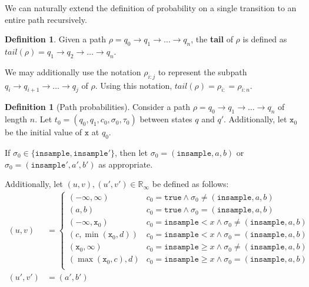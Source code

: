 \documentclass[12pt]{article}
\newcommand{\RR}{\mathbb{R}}
\newcommand{\gguard}[1][x]{\texttt{insample}\geq #1}
\newcommand{\lguard}[1][x]{\texttt{insample} < #1}
\theoremstyle{definition}
\newtheorem{defn}[thm]{Definition}
\begin{document}
We can naturally  extend the definition of probability on a single transition to an entire path recursively.

\begin{defn}
    Given a path $\rho = q_0\to q_1\to \ldots \to q_n$, the \textbf{tail} of $\rho$ is defined as $tail(\rho) = q_1\to q_2 \to \ldots\to q_n$. 

    We may additionally use the notation $\rho_{i:j}$ to represent the subpath $q_i\to q_{i+1}\to \ldots \to q_j$ of $\rho$. Using this notation, $tail(\rho) = \rho_{i:} = \rho_{i:n}$.
\end{defn}

\begin{defn}[Path probabilities]
    Consider a path $\rho = q_0\to q_1\to \ldots \to q_n$ of length $n$. Let $t_0=(q_0, q_1, c_0, \sigma_0, \tau_0)$ between states $q$ and $q'$. Additionally, let $\texttt{x}_0$ be the initial value of $\texttt{x}$ at $q_0$. 
    
    If $\sigma_0 \in \{\texttt{insample}, \texttt{insample}'\}$, then let $\sigma_0 = (\texttt{insample}, a, b)$ or $\sigma_0 = (\texttt{insample}', a', b')$ as appropriate. 

    Additionally, let $(u, v), (u', v')\in \RR_{\infty}$ be defined as follows:
    \begin{align*}
        (u, v) &= \begin{cases}
        (-\infty, \infty) & c_0=\texttt{true}\land \sigma_0 \neq (\texttt{insample}, a, b)\\
        (a, b) &c_0=\texttt{true}\land \sigma_0 = (\texttt{insample}, a, b)\\
        (-\infty, \texttt{x}_0) & c_0=\lguard\land \sigma_0 \neq (\texttt{insample}, a, b)\\
        (c, \min(\texttt{x}_0, d)) &c_0=\lguard\land \sigma_0 = (\texttt{insample}, a, b)\\
        (\texttt{x}_0, \infty) & c_0=\gguard\land \sigma_0 \neq (\texttt{insample}, a, b)\\
        (\max(\texttt{x}_0, c), d) &c_0=\gguard\land \sigma_0 = (\texttt{insample}, a, b)\\
    \end{cases}\\
    (u', v')& = (a', b')\end{align*}


\end{defn}
\end{document}
